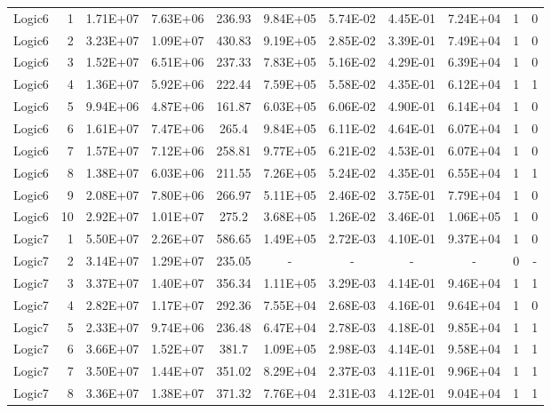 \begin{longtable}{@{}l!{\vrule}r!{\vrule}c!{\vrule}c!{\vrule}c!{\vrule}c!{\vrule}c!{\vrule}c!{\vrule}c!{\vrule}c!{\vrule}c@{}}
\hline
Logic6 & 1 & 1.71E+07 & 7.63E+06 & 236.93 & 9.84E+05 & 5.74E-02 & 4.45E-01 & 7.24E+04 & 1 & 0 \\
Logic6 & 2 & 3.23E+07 & 1.09E+07 & 430.83 & 9.19E+05 & 2.85E-02 & 3.39E-01 & 7.49E+04 & 1 & 0 \\
Logic6 & 3 & 1.52E+07 & 6.51E+06 & 237.33 & 7.83E+05 & 5.16E-02 & 4.29E-01 & 6.39E+04 & 1 & 0 \\
Logic6 & 4 & 1.36E+07 & 5.92E+06 & 222.44 & 7.59E+05 & 5.58E-02 & 4.35E-01 & 6.12E+04 & 1 & 1 \\
Logic6 & 5 & 9.94E+06 & 4.87E+06 & 161.87 & 6.03E+05 & 6.06E-02 & 4.90E-01 & 6.14E+04 & 1 & 0 \\
Logic6 & 6 & 1.61E+07 & 7.47E+06 & 265.4 & 9.84E+05 & 6.11E-02 & 4.64E-01 & 6.07E+04 & 1 & 0 \\
Logic6 & 7 & 1.57E+07 & 7.12E+06 & 258.81 & 9.77E+05 & 6.21E-02 & 4.53E-01 & 6.07E+04 & 1 & 0 \\
Logic6 & 8 & 1.38E+07 & 6.03E+06 & 211.55 & 7.26E+05 & 5.24E-02 & 4.35E-01 & 6.55E+04 & 1 & 1 \\
Logic6 & 9 & 2.08E+07 & 7.80E+06 & 266.97 & 5.11E+05 & 2.46E-02 & 3.75E-01 & 7.79E+04 & 1 & 0 \\
Logic6 & 10 & 2.92E+07 & 1.01E+07 & 275.2 & 3.68E+05 & 1.26E-02 & 3.46E-01 & 1.06E+05 & 1 & 0 \\
\hline
{}
Logic7 & 1 & 5.50E+07 & 2.26E+07 & 586.65 & 1.49E+05 & 2.72E-03 & 4.10E-01 & 9.37E+04 & 1 & 0 \\
Logic7 & 2 & 3.14E+07 & 1.29E+07 & 235.05 & - & - & - & - & 0 & - \\
Logic7 & 3 & 3.37E+07 & 1.40E+07 & 356.34 & 1.11E+05 & 3.29E-03 & 4.14E-01 & 9.46E+04 & 1 & 1 \\
Logic7 & 4 & 2.82E+07 & 1.17E+07 & 292.36 & 7.55E+04 & 2.68E-03 & 4.16E-01 & 9.64E+04 & 1 & 0 \\
Logic7 & 5 & 2.33E+07 & 9.74E+06 & 236.48 & 6.47E+04 & 2.78E-03 & 4.18E-01 & 9.85E+04 & 1 & 1 \\
Logic7 & 6 & 3.66E+07 & 1.52E+07 & 381.7 & 1.09E+05 & 2.98E-03 & 4.14E-01 & 9.58E+04 & 1 & 1 \\
Logic7 & 7 & 3.50E+07 & 1.44E+07 & 351.02 & 8.29E+04 & 2.37E-03 & 4.11E-01 & 9.96E+04 & 1 & 1 \\
Logic7 & 8 & 3.36E+07 & 1.38E+07 & 371.32 & 7.76E+04 & 2.31E-03 & 4.12E-01 & 9.04E+04 & 1 & 1 \\

\end{longtable}
